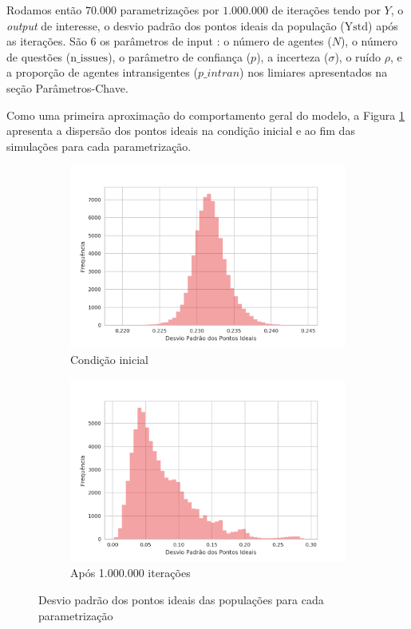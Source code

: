 Rodamos então \(70.000\) parametrizações por \(1.000.000\) de iterações tendo
por \(Y\), o \textit{output} de interesse, o desvio padrão  dos pontos ideais da
população (\(\text{Ystd}\)) após as iterações. São \(6\) os parâmetros de input
: o número de agentes (\(N\)), o número de questões (\(\text{n\_issues}\)), o
parâmetro de confiança (\(p\)), a incerteza (\(\sigma\)),  o ruído \(\rho\), e a
proporção de agentes intransigentes (\(p\_intran\)) nos
limiares apresentados na seção Parâmetros-Chave.

Como uma primeira aproximação do comportamento geral do modelo, a Figura
\ref{fig:hists1} apresenta a dispersão dos pontos ideais na condição inicial e
ao fim das simulações para cada parametrização.

\begin{figure}[h]
    \centering
    \begin{subfigure}[b]{0.49\textwidth}
      \includegraphics[width=\textwidth]{ims/diststdinit.png}
      \caption{Condição inicial}
    \end{subfigure}
    \begin{subfigure}[b]{0.49\textwidth}
      \includegraphics[width=\textwidth]{ims/distY.png}
       \caption{Após 1.000.000 iterações}
      \end{subfigure}
      \caption{Desvio padrão dos pontos ideais das populações para cada
        parametrização}
      \label{fig:hists1}
    \end{figure}
    
